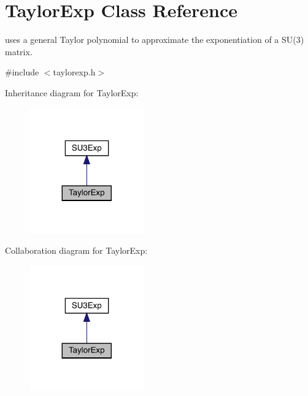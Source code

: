 \hypertarget{class_taylor_exp}{}\section{Taylor\+Exp Class Reference}
\label{class_taylor_exp}


uses a general Taylor polynomial to approximate the exponentiation of a S\+U(3) matrix.  




{\ttfamily \#include $<$taylorexp.\+h$>$}



Inheritance diagram for Taylor\+Exp\+:
\nopagebreak
\begin{figure}[H]
\begin{center}
\leavevmode
\includegraphics[width=140pt]{class_taylor_exp__inherit__graph}
\end{center}
\end{figure}


Collaboration diagram for Taylor\+Exp\+:
\nopagebreak
\begin{figure}[H]
\begin{center}
\leavevmode
\includegraphics[width=140pt]{class_taylor_exp__coll__graph}
\end{center}
\end{figure}
